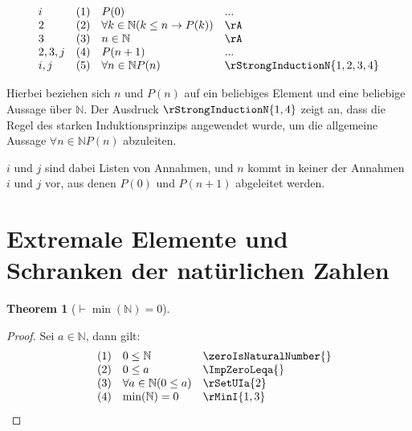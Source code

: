 \documentclass{book}
\theoremstyle{plain}
\newtheorem{theorem}{Theorem}
\theoremstyle{remark}
\theoremstyle{definition}
\begin{document}
\[
\begin{array}{llll}
    i & (1) & P(0) & ... \\
    2 & (2) & \forall k \in \mathbb{N} (k \leq n \rightarrow P(k)) & \rA \\
    3 & (3) & n \in \mathbb{N} & \rA \\
    2,3,j & (4) & P(n+1) & ... \\
    i,j & (5) & \forall n \in \mathbb{N} P(n) & \rStrongInductionN{1,2,3,4}
\end{array}
\]

Hierbei beziehen sich \(n\) und \(P(n)\) auf ein beliebiges Element und eine beliebige Aussage über \(\mathbb{N}\). Der Ausdruck \(\rStrongInductionN{1,4}\) zeigt an, dass die Regel des starken Induktionsprinzips angewendet wurde, um die allgemeine Aussage \(\forall n \in \mathbb{N} P(n)\) abzuleiten.

\(i\) und \(j\) sind dabei Listen von Annahmen, und \(n\) kommt in keiner der Annahmen \(i\) und \(j\) vor, aus denen \(P(0)\) und \(P(n+1)\) abgeleitet werden.

\section{Extremale Elemente und Schranken der natürlichen Zahlen}
\begin{theorem}[\(\vdash \min(\mathbb{N}) = 0\)]
\end{theorem}
\begin{proof}
        Sei \(a\in\mathbb{N}\), dann gilt:
	\[
	\begin{array}{llll}
          & (1) & 0\leq \mathbb{N} & \zeroIsNaturalNumber{} \\
		 & (2) & 0\leq a & \ImpZeroLeqa{} \\
          & (3) & \forall a\in\mathbb{N}(0\leq a) & \rSetUIa{2} \\
          & (4) & \min(\mathbb{N}) = 0 & \rMinI{1,3} \\
	\end{array}
	\]
\end{proof}
\end{document}
